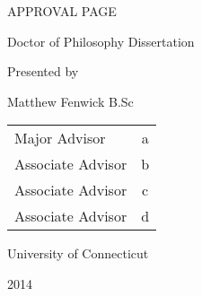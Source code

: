 \newpage
\begin{center}
  APPROVAL PAGE
  
  \vspace{1cm}
  
  Doctor of Philosophy Dissertation
  
  \vspace{1in}
  
  {\Large \mattftitle{}}
  
  \vspace{1in}
  
  Presented by
  
  Matthew Fenwick B.Sc
  
  \vspace{1cm}
  
  \begin{tabular}{ l c }  
    Major Advisor     & a \\ %
    Associate Advisor & b \\
    Associate Advisor & c \\
    Associate Advisor & d \\
  \end{tabular}

  \vfill

  University of Connecticut
  
  2014  
\end{center}

